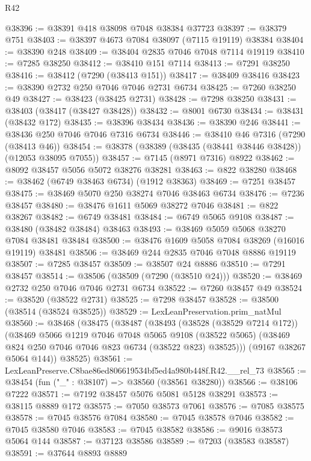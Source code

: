 \begin{lexlean}{R42}
\begin{coremodule}
{@38396 := @38391 @418 @38098 @7048 @38384 @37723
@38397 := @38379 @751
@38403 := @38397 @4673 @7084 @38097 (@7115 @19119) @38384
@38404 := @38390 @248
@38409 := @38404 @2835 @7046 @7048 @7114 @19119
@38410 := @7285 @38250
@38412 := @38410 @151 @7114
@38413 := @7291 @38250
@38416 := @38412 (@7290 (@38413 @151))
@38417 := @38409 @38416
@38423 := @38390 @2732 @250 @7046 @7046 @2731 @6734
@38425 := @7260 @38250 @49
@38427 := @38423 (@38425 @2731)
@38428 := @7298 @38250
@38431 := @38403 (@38417 (@38427 @38428))
@38432 := @8001 @6730
@38434 := @38431 (@38432 @172)
@38435 := @38396 @38434
@38436 := @38390 @246
@38441 := @38436 @250 @7046 @7046 @7316 @6734
@38446 := @38410 @46 @7316 (@7290 (@38413 @46))
@38454 := @38378 (@38389 (@38435 (@38441 @38446 @38428)) (@12053 @38095 @7055))
@38457 := @7145 (@8971 @7316) @8922
@38462 := @8092 @38457 @5056 @5072 @38276 @38281
@38463 := @822 @38280
@38468 := @38462 (@6749 @38463 @6734) (@1912 @38363)
@38469 := @7251 @38457
@38475 := @38469 @5070 @250 @38274 @7046 @38463 @6734
@38476 := @7236 @38457
@38480 := @38476 @1611 @5069 @38272 @7046
@38481 := @822 @38267
@38482 := @6749 @38481
@38484 := @6749 @5065 @9108
@38487 := @38480 (@38482 @38484) @38463
@38493 := @38469 @5059 @5068 @38270 @7084 @38481 @38484
@38500 := @38476 @1609 @5058 @7084 @38269 (@16016 @19119) @38481
@38506 := @38469 @244 @2835 @7046 @7048 @8886 @19119
@38507 := @7285 @38457
@38509 := @38507 @24 @8886
@38510 := @7291 @38457
@38514 := @38506 (@38509 (@7290 (@38510 @24)))
@38520 := @38469 @2732 @250 @7046 @7046 @2731 @6734
@38522 := @7260 @38457 @49
@38524 := @38520 (@38522 @2731)
@38525 := @7298 @38457
@38528 := @38500 (@38514 (@38524 @38525))
@38529 := LexLeanPreservation.prim_natMul
@38560 := @38468
    (@38475
      (@38487
        (@38493
          (@38528 (@38529 @7214 @172))
          (@38469
            @5066
            @1219
            @7046
            @7048
            @5065
            @9108
            (@38522 @5065)
            (@38469 @824 @250 @7046 @7046 @823 @6734 (@38522 @823) @38525)))
        (@9167 @38267 @5064 @144))
      @38525)
@38561 := LexLeanPreserve.C8bae86ed806619534bf5ed4a980b448f.R42.__rel_73
@38565 := @38454 (fun ("_" : @38107) => @38560 (@38561 @38280))
@38566 := @38106 @7222
@38571 := @7192 @38457 @5076 @5081 @5128 @38291
@38573 := @38115 @8889 @172
@38575 := @7050 @38573 @7061
@38576 := @7085 @38575
@38578 := @7045 @38576 @7084
@38580 := @7045 @38578 @7046
@38582 := @7045 @38580 @7046
@38583 := @7045 @38582
@38586 := @9016 @38573 @5064 @144
@38587 := @37123 @38586
@38589 := @7203 (@38583 @38587)
@38591 := @37644 @8893 @8889
}
\end{coremodule}
\end{lexlean}
